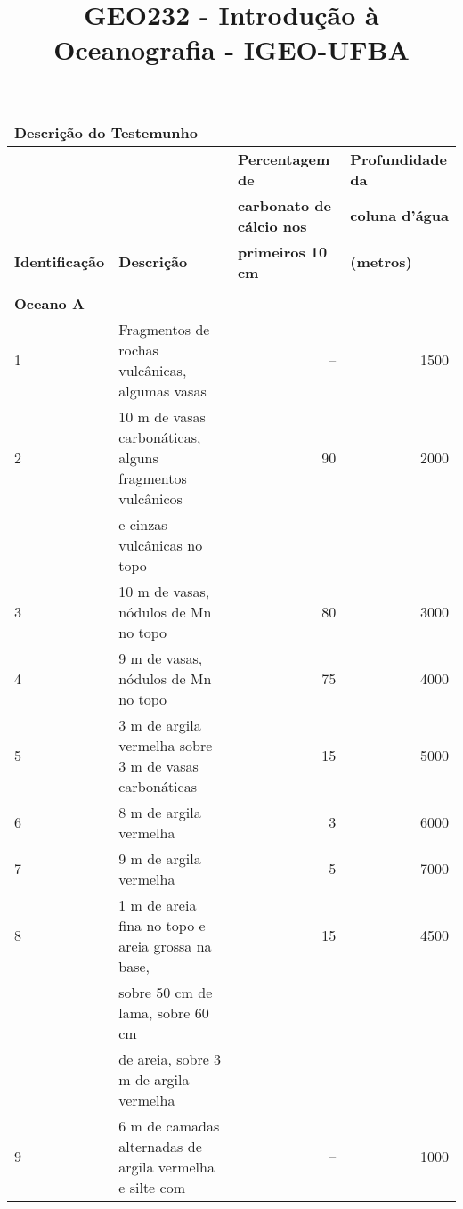\documentclass[a4paper,10pt]{article}
\title{GEO232 - Introdução à Oceanografia - IGEO-UFBA}
\author{\vspace{-10ex}}
\date{\vspace{-10ex}}
\begin{document}
\phantom{}

\vspace{2cm}

{\small
\begin{center}
  \begin{tabular}{l l r r}
    \multicolumn{4}{l}{\Large{{\bf Descrição do Testemunho}}} \\
    \hline
                        &                  & \multicolumn{1}{l}{{\bf Percentagem de}}          & \multicolumn{1}{l}{{\bf Profundidade da}}    \\
                        &                  & \multicolumn{1}{l}{{\bf carbonato de cálcio nos}} & \multicolumn{1}{l}{{\bf coluna d'água}}    \\
    {\bf Identificação} & {\bf Descrição}  & \multicolumn{1}{l}{{\bf primeiros 10 cm}}         & \multicolumn{1}{l}{{\bf (metros)}} \\
    \hline
    \multicolumn{4}{l}{\phantom{}} \\
    \multicolumn{4}{l}{{\bf Oceano A}} \\
    1 & Fragmentos de rochas vulcânicas, algumas vasas                  & -- & 1500 \\
    2 & 10 m de vasas carbonáticas, alguns fragmentos vulcânicos        & 90 & 2000 \\
      & e cinzas vulcânicas no topo                                     &    &      \\
    3 & 10 m de vasas, nódulos de Mn no topo                            & 80 & 3000 \\
    4 & 9 m de vasas, nódulos de Mn no topo                             & 75 & 4000 \\
    5 & 3 m de argila vermelha sobre 3 m de vasas carbonáticas          & 15 & 5000 \\
    6 & 8 m de argila vermelha                                          &  3 & 6000 \\
    7 & 9 m de argila vermelha                                          &  5 & 7000 \\
    8 & 1 m de areia fina no topo e areia grossa na base,               & 15 & 4500 \\
      & sobre 50 cm de lama, sobre 60 cm                     &    &      \\
      & de areia, sobre 3 m de argila vermelha                          &    &      \\
    9 & 6 m de camadas alternadas de argila vermelha e silte com      & -- & 1000 \\

\end{tabular}
\end{center}}
\end{document}
